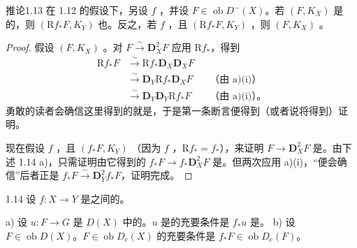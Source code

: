 \begin{SGAresult}{推论}{1.13}
在 1.12 的假设下，另设 $f$ ，并设 $F\in\operatorname{ob}D^-(X)$。若 $(F,K_X)$ 是的，则 $(\mathrm Rf_*F,K_Y)$ 也。反之，若 $f$ ，且 $(\mathrm Rf_*F,K_Y)$ ，则 $(F,K_X)$ 。
\end{SGAresult}
\begin{proof}
假设 $(F,K_X)$ 。对 $F\xrightarrow{\sim}\mathbf D_X^2F$ 应用 $\mathrm Rf_*$，得到
\[
 \begin{aligned}
 \mathrm Rf_*F&\xrightarrow{\sim}\mathrm Rf_*\mathbf D_X\mathbf D_XF\\
 &\xrightarrow{\sim}\mathbf D_Y\mathrm Rf_*\mathbf D_XF&&\text{（由 a)(i)）}\\
 &\xrightarrow{\sim}\mathbf D_Y\mathbf D_Y\mathrm Rf_*F&&\text{（由 a)(i)）。}
 \end{aligned}
\]
勇敢的读者会确信这里得到的就是，于是第一条断言便得到（或者说将得到）证明。

现在假设 $f$ ，且 $(f_*F,K_Y)$ （因为 $f$ ，$\mathrm Rf_*=f_*$），来证明 $F\longrightarrow\mathbf D_X^2F$ 是。由下述 1.14 a)，只需证明由它得到的 $f_*F\longrightarrow f_*\mathbf D_X^2F$ 是。但两次应用 a)(i)，“便会确信”后者正是 $f_*F\xrightarrow{\sim}\mathbf D_Y^2f_*F$，证明完成。
\end{proof}
\begin{SGAresult}{}{1.14}
设 $f:X\longrightarrow Y$ 是之间的。

a) 设 $u:F\longrightarrow G$ 是 $D(X)$ 中的。$u$ 是的充要条件是 $f_*u$ 是。
b) 设 $F\in\operatorname{ob}D(X)$。$F\in\operatorname{ob}D_c(X)$ 的充要条件是 $f_*F\in\operatorname{ob}D_c(F)$。
\end{SGAresult}
